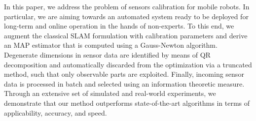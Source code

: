 In this paper, we address the problem of sensors calibration for mobile robots.
In particular, we are aiming towards an automated system ready to be deployed
for long-term and online operation in the hands of non-experts. To this end, we
augment the classical SLAM formulation with calibration parameters and derive
an MAP estimator that is computed using a Gauss-Newton algorithm. Degenerate
dimensions in sensor data are identified by means of QR decomposition and
automatically discarded from the optimization via a truncated method, such that
only observable parts are exploited. Finally, incoming sensor data is processed
in batch and selected using an information theoretic measure. Through an
extensive set of simulated and real-world experiments, we demonstrate that our
method outperforms state-of-the-art algorithms in terms of applicability,
accuracy, and speed.
